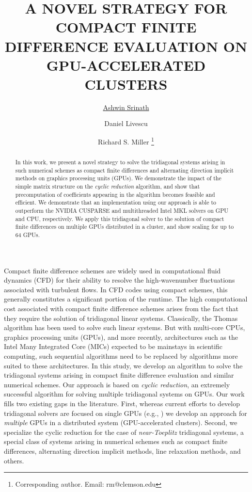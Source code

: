 \documentclass[letterpaper,10pt]{article}
\begin{document}
\title{A NOVEL STRATEGY FOR COMPACT FINITE DIFFERENCE EVALUATION
ON GPU-ACCELERATED CLUSTERS}

\author[1]{\underline{Ashwin Srinath}}
\author[2]{Daniel Livescu}
\author[3]{Richard S. Miller \footnote{
Corresponding author. Email: rm@clemson.edu}}
\maketitle

\begin{abstract} 
In this work,
we present a novel strategy to solve the
tridiagonal systems arising in such numerical schemes
as compact finite differences
and alternating direction implicit methods
on graphics processing units (GPUs).
We demonstrate the impact of the simple matrix structure
on the \emph{cyclic reduction} algorithm,
and show that precomputation of coefficients appearing in the
algorithm becomes feasible and efficient.
We demonstrate that an implementation using our approach
is able to outperform
the NVIDIA CUSPARSE and multithreaded Intel MKL solvers
on GPU and CPU, respectively.
We apply this tridiagonal solver
to the solution of
compact finite differences on multiple GPUs
distributed in a cluster,
and show scaling for up to 64 GPUs.

\end{abstract}

Compact finite difference schemes
\cite{lele1992compact,kennedy1994several}
are widely used
in computational fluid dynamics (CFD)
for their ability to resolve the high-wavenumber fluctuations
associated with turbulent flows.
In CFD codes using compact schemes,
this generally constitutes a significant portion of the runtime.
The high computational cost associated with
compact finite difference schemes arises from the fact that they require
the solution of tridiagonal linear systems.
Classically, the Thomas algorithm has been used to solve such linear systems.
But with multi-core CPUs, graphics processing units (GPUs),
and more recently,
architectures such as the
Intel Many Integrated Core (MICs)
expected to be mainstays in scientific computing,
such sequential algorithms need to be
replaced by algorithms more suited to these architectures.
In this study,
we develop an algorithm to solve the tridiagonal systems
arising in compact finite difference evaluation
and similar numerical schemes.
Our approach is based on \emph{cyclic reduction},
an extremely successful algorithm for solving multiple
tridiagonal systems on GPUs.
Our work fills two existing gaps in the literature.
First,
whereas current efforts to develop tridiagonal solvers
are focused on single GPUs (e.g., 
\cite{GoSt11CR,
davidson2011register,
esfahanian2014efficient,
tutkun2012gpu,
zhao2015efficiently})
we develop an approach for \emph{multiple} GPUs
in a distributed system (GPU-accelerated clusters).
Second, we specialize the cyclic reduction for the case
of \emph{near-Toeplitz} tridiagonal systems,
a special class of systems arising in numerical schemes
such as compact finite differences,
alternating direction implicit methods,
line relaxation methods, and others.
\end{document}
